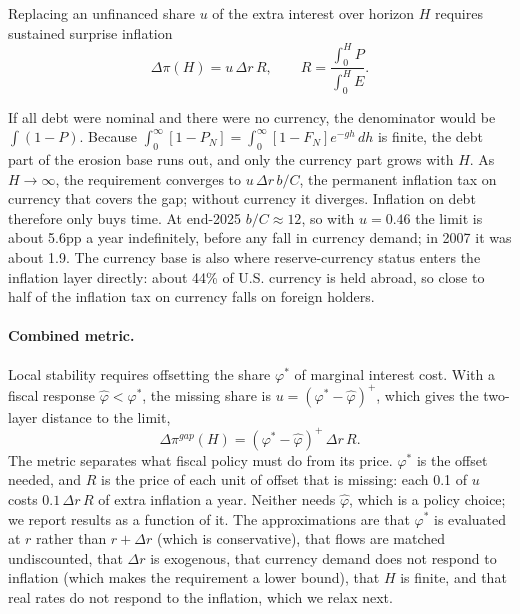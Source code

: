 \begin{proposition}\label{prop:price}
Replacing an unfinanced share $u$ of the extra interest over horizon $H$ requires sustained surprise inflation
\begin{equation}
\Delta\pi(H)=u\,\Delta r\,R,\qquad R=\frac{\int_0^H P}{\int_0^H E}.
\end{equation}
\end{proposition}

If all debt were nominal and there were no currency, the denominator would be $\int(1-P)$. Because $\int_0^\infty[1-P_N]=\int_0^\infty[1-F_N]e^{-gh}\,dh$ is finite, the debt part of the erosion base runs out, and only the currency part grows with $H$. As $H\to\infty$, the requirement converges to $u\,\Delta r\,b/C$, the permanent inflation tax on currency that covers the gap; without currency it diverges. Inflation on debt therefore only buys time. At end-2025 $b/C\approx12$, so with $u=0.46$ the limit is about 5.6pp a year indefinitely, before any fall in currency demand; in 2007 it was about 1.9. The currency base is also where reserve-currency status enters the inflation layer directly: about 44\% of U.S. currency is held abroad, so close to half of the inflation tax on currency falls on foreign holders.

\paragraph{Combined metric.} Local stability requires offsetting the share $\varphi^*$ of marginal interest cost. With a fiscal response $\hat\varphi<\varphi^*$, the missing share is $u=(\varphi^*-\hat\varphi)^+$, which gives the two-layer distance to the limit,
\begin{equation}\label{eq:combined}
\Delta\pi^{gap}(H)=(\varphi^*-\hat\varphi)^+\,\Delta r\,R.
\end{equation}
The metric separates what fiscal policy must do from its price. $\varphi^*$ is the offset needed, and $R$ is the price of each unit of offset that is missing: each 0.1 of $u$ costs $0.1\,\Delta r\,R$ of extra inflation a year. Neither needs $\hat\varphi$, which is a policy choice; we report results as a function of it. The approximations are that $\varphi^*$ is evaluated at $r$ rather than $r+\Delta r$ (which is conservative), that flows are matched undiscounted, that $\Delta r$ is exogenous, that currency demand does not respond to inflation (which makes the requirement a lower bound), that $H$ is finite, and that real rates do not respond to the inflation, which we relax next.

